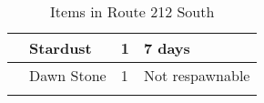 \begin{longtable}{|| l l l l ||}%
\hline%
&Stardust&1&7 days\\%
\hline%
&Dawn Stone&1&Not respawnable\\%
\hline%
\endhead%
\hline%
\caption{Items in Route 212 South}%
\label{tab:Route212SouthItems}%
\end{longtable}